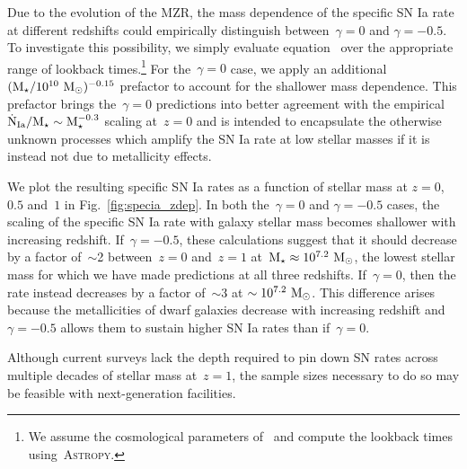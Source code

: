 \documentclass[ms.tex]{subfiles}
\begin{document}
Due to the evolution of the MZR, the mass dependence of the specific SN Ia rate
at different redshifts could empirically distinguish between~$\gamma = 0$ and
$\gamma = -0.5$.
To investigate this possibility, we simply evaluate equation~
over the appropriate range of lookback times.\footnote{
	We assume the cosmological parameters of~\citet{Planck2014} and compute the
	lookback times using~\textsc{Astropy}.
}
For the~$\gamma = 0$ case, we apply an additional
$(\text{M}_\star / 10^{10}~\text{M}_\odot)^{-0.15}$ prefactor to account for the shallower mass
dependence.
This prefactor brings the~$\gamma = 0$ predictions into better agreement with
the empirical~$\dot{\text{N}}_\text{Ia} / \text{M}_\star \sim \text{M}_\star^{-0.3}$ scaling
at~$z = 0$ and is intended to encapsulate the otherwise unknown processes which
amplify the SN Ia rate at low stellar masses if it is instead not due to
metallicity effects.
\par
We plot the resulting specific SN Ia rates as a function of stellar mass at
$z = 0$,~$0.5$ and~$1$ in Fig.~\ref{fig:specia_zdep}.
In both the~$\gamma = 0$ and $\gamma = -0.5$ cases, the scaling of the specific
SN Ia rate with galaxy stellar mass becomes shallower with increasing redshift.
If~$\gamma = -0.5$, these calculations suggest that it should decrease by a
factor of~$\sim$2 between~$z = 0$ and~$z = 1$ at~$\text{M}_\star \approx
10^{7.2}~\text{M}_\odot$, the lowest stellar mass for which we have made predictions at
all three redshifts.
If~$\gamma = 0$, then the rate instead decreases by a factor of~$\sim$3 at
$\sim 10^{7.2}~\text{M}_\odot$.
This difference arises because the metallicities of dwarf galaxies decrease
with increasing redshift and~$\gamma = -0.5$ allows them to sustain higher
SN Ia rates than if~$\gamma = 0$.
\par
Although current surveys lack the depth required to pin down SN rates across
multiple decades of stellar mass at~$z = 1$, the sample sizes necessary to do
so may be feasible with next-generation facilities.
\end{document}
